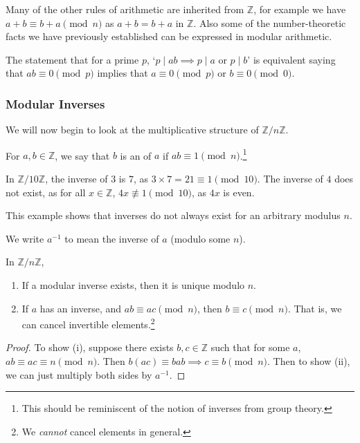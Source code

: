 \documentclass[a4paper]{scrartcl}
\begin{document}
Many of the other rules of arithmetic are inherited from $\mathbb{Z}$, for example we have $a + b \equiv b+a \pmod{n}$ as $a + b = b + a$ in $\mathbb{Z}$. Also some of the number-theoretic facts we have previously established can be expressed in modular arithmetic.

\begin{example}
	The statement that for a prime $p$, `$p \mid ab \implies p \mid a$ or $p \mid b$' is equivalent saying that $ab \equiv 0 \pmod{p}$ implies that $a \equiv 0 \pmod{p}$ or $b \equiv 0 \pmod{0}$.
\end{example}

\subsubsection{Modular Inverses}

We will now begin to look at the multiplicative structure of $\mathbb{Z}/n\mathbb{Z}$. 

\begin{definition}
	For $a, b \in \mathbb{Z}$, we say that $b$ is an  of $a$ if $ab \equiv 1 \pmod{n}$.\footnote{This should be reminiscent of the notion of inverses from group theory.}
\end{definition}

\begin{example}
	In $\mathbb{Z}/10\mathbb{Z}$, the inverse of $3$ is $7$, as $3\times 7 = 21\equiv 1 \pmod{10}$. The inverse of $4$ does not exist, as for all $x \in \mathbb{Z}$, $4x \not\equiv 1 \pmod{10}$, as $4x$ is even.

	This example shows that inverses do not always exist for an arbitrary modulus $n$.
\end{example}

\begin{notation}
	We write $a^{-1}$ to mean the inverse of $a$ (modulo some $n$).
\end{notation}

\begin{proposition}
	In $\mathbb{Z}/n\mathbb{Z}$,
	\begin{enumerate}[label=(\roman*)]
		\item If a modular inverse exists, then it is unique modulo $n$.
		\item If $a$ has an inverse, and $ab \equiv ac \pmod{n}$, then $b \equiv c \pmod{n}$. That is, we can cancel invertible elements.\footnote{We \emph{cannot} cancel elements in general.}
	\end{enumerate}
\end{proposition}
\begin{proof}
	To show (i),
	suppose there exists $b, c \in \mathbb{Z}$ such that for some $a$, $ab \equiv ac \equiv n \pmod{n}$. Then $b(ac) \equiv bab \implies c \equiv b \pmod{n}$. Then to show (ii), we can just multiply both sides by $a^{-1}$.
\end{proof}
\end{document}
